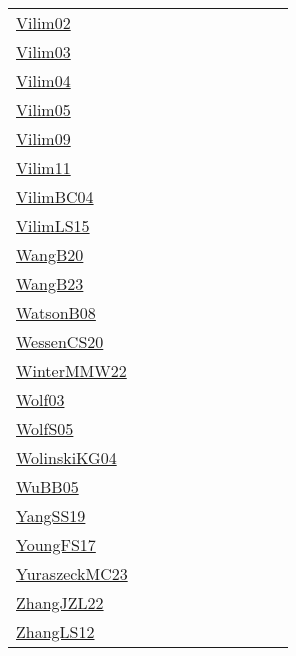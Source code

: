 {\begin{longtable}{p{3cm}p{4cm}p{2cm}p{2cm}p{2cm}p{2cm}p{2cm}p{2cm}p{2cm}p{2cm}}
\href{papers/Vilim02.pdf}{Vilim02}~\cite{Vilim02} &  &  &  &  &  &  &  &  & \\
\href{papers/Vilim03.pdf}{Vilim03}~\cite{Vilim03} &  &  &  &  &  &  &  &  & \\
\href{papers/Vilim04.pdf}{Vilim04}~\cite{Vilim04} &  &  &  &  &  &  &  &  & \\
\href{papers/Vilim05.pdf}{Vilim05}~\cite{Vilim05} &  &  &  &  &  &  &  &  & \\
\href{papers/Vilim09.pdf}{Vilim09}~\cite{Vilim09} &  &  &  &  &  &  &  &  & \\
\href{papers/Vilim11.pdf}{Vilim11}~\cite{Vilim11} &  &  &  &  &  &  &  &  & \\
\href{papers/VilimBC04.pdf}{VilimBC04}~\cite{VilimBC04} &  &  &  &  &  &  &  &  & \\
\href{papers/VilimLS15.pdf}{VilimLS15}~\cite{VilimLS15} &  &  &  &  &  &  &  &  & \\
\href{papers/WangB20.pdf}{WangB20}~\cite{WangB20} &  &  &  &  &  &  &  &  & \\
\href{papers/WangB23.pdf}{WangB23}~\cite{WangB23} &  &  &  &  &  &  &  &  & \\
\href{papers/WatsonB08.pdf}{WatsonB08}~\cite{WatsonB08} &  &  &  &  &  &  &  &  & \\
\href{papers/WessenCS20.pdf}{WessenCS20}~\cite{WessenCS20} &  &  &  &  &  &  &  &  & \\
\href{papers/WinterMMW22.pdf}{WinterMMW22}~\cite{WinterMMW22} &  &  &  &  &  &  &  &  & \\
\href{papers/Wolf03.pdf}{Wolf03}~\cite{Wolf03} &  &  &  &  &  &  &  &  & \\
\href{papers/WolfS05.pdf}{WolfS05}~\cite{WolfS05} &  &  &  &  &  &  &  &  & \\
\href{papers/WolinskiKG04.pdf}{WolinskiKG04}~\cite{WolinskiKG04} &  &  &  &  &  &  &  &  & \\
\href{papers/WuBB05.pdf}{WuBB05}~\cite{WuBB05} &  &  &  &  &  &  &  &  & \\
\href{papers/YangSS19.pdf}{YangSS19}~\cite{YangSS19} &  &  &  &  &  &  &  &  & \\
\href{papers/YoungFS17.pdf}{YoungFS17}~\cite{YoungFS17} &  &  &  &  &  &  &  &  & \\
\href{papers/YuraszeckMC23.pdf}{YuraszeckMC23}~\cite{YuraszeckMC23} &  &  &  &  &  &  &  &  & \\
\href{papers/ZhangJZL22.pdf}{ZhangJZL22}~\cite{ZhangJZL22} &  &  &  &  &  &  &  &  & \\
\href{papers/ZhangLS12.pdf}{ZhangLS12}~\cite{ZhangLS12} &  &  &  &  &  &  &  &  & \\

\end{longtable}}
